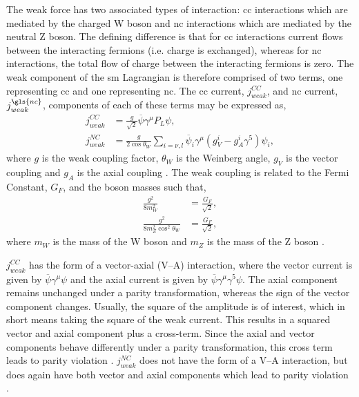 The weak force has two associated types of interaction: \gls{cc} interactions which are mediated by the charged W boson and \gls{nc} interactions which are mediated by the neutral Z boson. The defining difference is that for \gls{cc} interactions current flows between the interacting fermions (i.e. charge is exchanged), whereas for \gls{nc} interactions, the total flow of charge between the interacting fermions is zero. The weak component of the \gls{sm} Lagrangian is therefore comprised of two terms, one representing \gls{cc} and one representing \gls{nc}. The \gls{cc} current, $j^{CC}_{weak}$,  and \gls{nc} current, $j^{\gls{nc}}_{weak}$, components of each of these terms may be expressed as, 
\begin{equation}\label{eqn:weak current}
\begin{split}
    j^{CC}_{weak} &= \frac{g}{\sqrt{2}}\overline{\psi}\gamma^{\mu}P_L\psi, \\
    j^{NC}_{weak} &= \frac{g}{2\cos{\theta_W}}\sum_{i = \nu, l}
    \overline{\psi}_i \gamma^\mu (g_V^i - g_A^i \gamma^5)\psi_i, 
\end{split}
\end{equation}
where $g$ is the weak coupling factor, $\theta_W$ is the Weinberg angle, $g_V$ is the vector coupling and $g_A$ is the axial coupling \cite{Particles_and_Fundamental_Interactions:_An_Introduction_to_Particle_Physics}\cite{Fundamentals_of_Neutrino_Physics_and_Astrophysics}\cite{PDG_2022}. The weak coupling is related to the Fermi Constant, $G_F$, and the boson masses such that,
\begin{equation}
\begin{split}
    \frac{g^2}{8m^2_W} &= \frac{G_F}{\sqrt{2}}, \\
    \frac{g^2}{8m^2_Z\cos^2{\theta_W}} &= \frac{G_F}{\sqrt{2}},
\end{split}
\end{equation}
where $m_W$ is the mass of the W boson and $m_Z$ is the mass of the Z boson \cite{Fundamentals_of_Neutrino_Physics_and_Astrophysics}.

$j^{CC}_{weak}$ has the form of a vector-axial (V--A) interaction, where the vector current is given by $\overline{\psi}\gamma^\mu\psi$ and the axial current is given by $\overline{\psi}\gamma^\mu\gamma^5\psi$. The axial component remains unchanged under a parity transformation, whereas the sign of the vector component changes. Usually, the square of the amplitude is of interest, which in short means taking the square of the weak current. This results in a squared vector and axial component plus a cross-term. Since the axial and vector components behave differently under a parity transformation, this cross term leads to parity violation \cite{Particles_and_Fundamental_Interactions:_An_Introduction_to_Particle_Physics} \cite{Fundamentals_of_Neutrino_Physics_and_Astrophysics}. $j^{NC}_{weak}$ does not have the form of a V--A interaction, but does again have both vector and axial components which lead to parity violation \cite{Particles_and_Fundamental_Interactions:_An_Introduction_to_Particle_Physics}.

